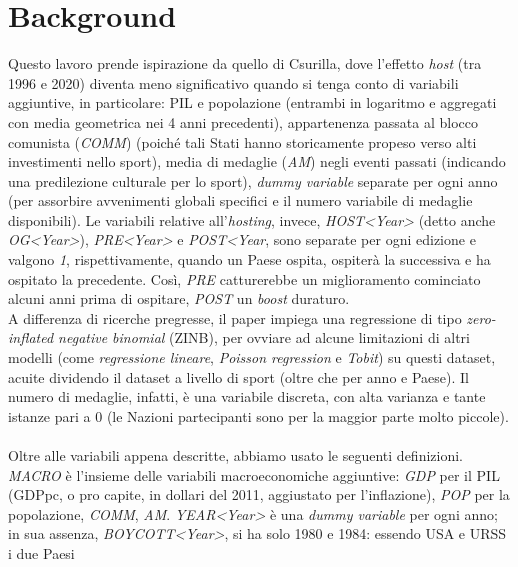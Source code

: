 \section{Background}\label{sec:background}

Questo lavoro prende ispirazione da quello di
Csurilla\cite{csurillaLessObviousEffect2023}, dove l'effetto \textit{host} (tra
1996 e 2020) diventa meno significativo quando si tenga conto di variabili
aggiuntive, in particolare: PIL e popolazione (entrambi in logaritmo e aggregati
con media geometrica nei 4 anni precedenti), appartenenza passata al blocco
comunista (\textit{COMM}) (poiché tali Stati hanno storicamente propeso verso
alti investimenti nello sport\cite{tobit1comm1,tobit3comm2,comm3,comm4}), media
di medaglie (\textit{AM}) negli eventi passati (indicando una predilezione
culturale per lo sport), \textit{dummy variable} separate per ogni anno (per
assorbire avvenimenti globali specifici e il numero variabile di medaglie
disponibili). Le variabili relative all'\textit{hosting}, invece,
\textit{HOST<Year>} (detto anche \textit{OG<Year>}), \textit{PRE<Year>} e
\textit{POST<Year}, sono separate per ogni edizione e valgono \textit{1},
rispettivamente, quando un Paese ospita, ospiterà la successiva e ha ospitato la
precedente. Così, \textit{PRE} catturerebbe un miglioramento cominciato alcuni
anni prima di ospitare, \textit{POST} un \textit{boost} duraturo.\\
A differenza di ricerche pregresse, il paper impiega una regressione di tipo
\textit{zero-inflated negative binomial} (ZINB), per ovviare ad alcune
limitazioni di altri modelli (come \textit{regressione lineare}, \textit{Poisson
regression} e
\textit{Tobit}\cite{tobit1comm1,tobit2,tobit3comm2,tobit4,tobit5,tobit6}) su
questi dataset, acuite dividendo il dataset a livello di sport (oltre che per
anno e Paese). Il numero di medaglie, infatti, è una variabile discreta, con
alta varianza e tante istanze pari a 0 (le Nazioni partecipanti sono per la
maggior parte molto piccole).\\
\\
Oltre alle variabili appena descritte, abbiamo usato le seguenti definizioni.
\textit{MACRO} è l'insieme delle variabili macroeconomiche aggiuntive:
\textit{GDP} per il PIL (GDPpc, o pro capite, in dollari del 2011, aggiustato
per l'inflazione), \textit{POP} per la popolazione, \textit{COMM}, \textit{AM}.
\textit{YEAR<Year>} è una \textit{dummy variable} per ogni anno; in sua assenza,
\textit{BOYCOTT<Year>}, si ha solo 1980 e 1984: essendo USA e URSS i due Paesi
